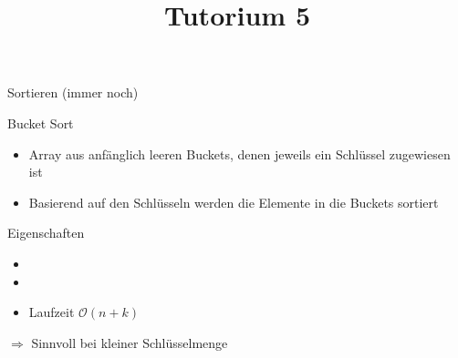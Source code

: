 
\title[Algorithmen I SS 14]{Tutorium 5}

\usepackage{alltt}





\begin{frame}
  \maketitle
\end{frame}

\begin{frame}
	\begin{center}
		\Huge
		Sortieren (immer noch)
	\end{center}
\end{frame}

\begin{frame}{Bucket Sort}
	\begin{itemize}
		\item Array aus anfänglich leeren Buckets, denen jeweils ein Schlüssel zugewiesen ist
		\item Basierend auf den Schlüsseln werden die Elemente in die Buckets sortiert
	\end{itemize}

	\begin{block}{Eigenschaften}
		\begin{itemize}
			\item {\color{english}{stabil}}
			\item {\color{red}{nicht inplace}}
			\item Laufzeit $\mathcal{O}(n+k)$
		\end{itemize}
	\end{block}


	$\Rightarrow$ Sinnvoll bei kleiner Schlüsselmenge

\end{frame}

